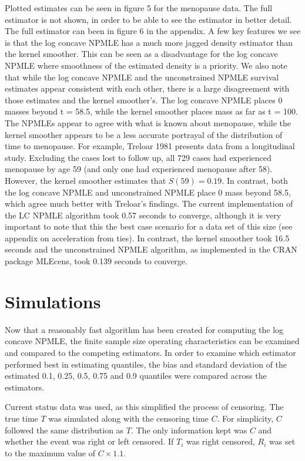 \documentclass[12pt]{article}
\numberwithin{equation}{section}
\begin{document}
	Plotted estimates can be seen in figure 5 for the menopause data. The full estimator is not shown, in order to be able to see the estimator in better detail. The full estimator can been in figure 6 in the appendix. A few key features we see is that the log concave NPMLE has a much more jagged density estimator than the kernel smoother. This can be seen as a disadvantage for the log concave NPMLE where smoothness of the estimated density is a priority. We also note that while the log concave NPMLE and the unconstrained NPMLE survival estimates appear consistent with each other, there is a large disagreement with those estimates and the kernel smoother's. The log concave NPMLE places 0 masses beyond t = 58.5, while the kernel smoother places mass as far as t = 100. The NPMLEs appear to agree with what is known about menopause, while the kernel smoother appears to be a less accurate portrayal of the distribution of time to menopause. For example, Treloar 1981 presents data from a longitudinal study. Excluding the cases lost to follow up, all 729 cases had experienced menopause by age 59 (and only one had experienced menopause after 58). However, the kernel smoother estimates that $S(59) =  0.19$. In contrast, both the log concave NPMLE and unconstrained NPMLE place 0 mass beyond 58.5, which agree much better with Treloar's findings. The current implementation of the LC NPMLE algorithm took 0.57 seconds to converge, although it is very important to note that this the best case scenario for a data set of this size (see appendix on acceleration from ties). In contrast, the kernel smoother took 16.5 seconds and the unconstrained NPMLE algorithm, as implemented in the CRAN package  MLEcens, took 0.139 seconds to converge. 
	
	
	{\section{Simulations} } 
	
	Now that a reasonably fast algorithm has been created for computing the log concave NPMLE, the finite sample size operating characteristics can be examined and compared to the competing estimators. In order to examine which estimator performed best in estimating quantiles, the bias and standard deviation of the estimated 0.1, 0.25, 0.5, 0.75 and 0.9 quantiles were compared across the estimators. 
			
	Current status data was used, as this simplified the process of censoring. The true time $T$ was simulated along with the censoring time $C$. For simplicity, $C$ followed the same distribution as $T$. The only information kept was $C$ and whether the event was right or left censored. If $T_i$ was right censored, $R_i$ was set to the maximum value of $C \times 1.1$.
\end{document}
